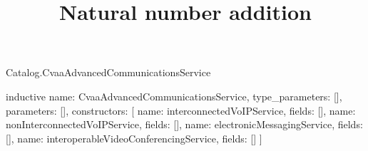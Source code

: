\begin{lexlean}{Catalog.CvaaAdvancedCommunicationsService}
\title{Natural number addition}
\begin{semanticmodule}
inductive{
  name: CvaaAdvancedCommunicationsService,
  type_parameters: [],
  parameters: [],
  constructors: [
    {name: interconnectedVoIPService, fields: []},
    {name: nonInterconnectedVoIPService, fields: []},
    {name: electronicMessagingService, fields: []},
    {name: interoperableVideoConferencingService, fields: []}
  ]
}
\end{semanticmodule}
\end{lexlean}
